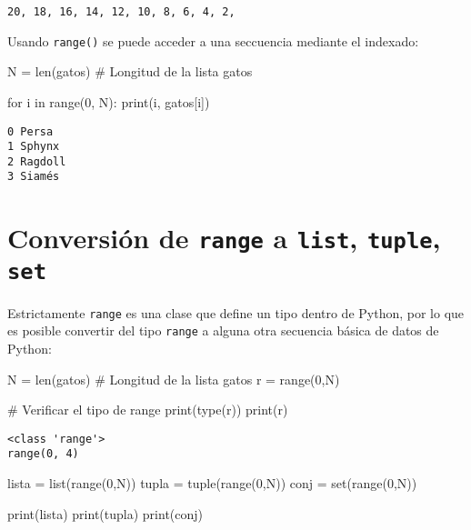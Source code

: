 \documentclass[
  letterpaper,
  DIV=11,
  numbers=noendperiod]{scrreprt}
\newenvironment{Shaded}{\begin{snugshade}}{\end{snugshade}}
\newcommand{\BuiltInTok}[1]{\textcolor[rgb]{0.00,0.23,0.31}{#1}}
\newcommand{\CommentTok}[1]{\textcolor[rgb]{0.37,0.37,0.37}{#1}}
\newcommand{\ControlFlowTok}[1]{\textcolor[rgb]{0.00,0.23,0.31}{#1}}
\newcommand{\DecValTok}[1]{\textcolor[rgb]{0.68,0.00,0.00}{#1}}
\newcommand{\KeywordTok}[1]{\textcolor[rgb]{0.00,0.23,0.31}{#1}}
\newcommand{\NormalTok}[1]{\textcolor[rgb]{0.00,0.23,0.31}{#1}}
\newcommand{\OperatorTok}[1]{\textcolor[rgb]{0.37,0.37,0.37}{#1}}
\begin{document}
\begin{verbatim}
20, 18, 16, 14, 12, 10, 8, 6, 4, 2, 
\end{verbatim}

Usando \texttt{range()} se puede acceder a una seccuencia mediante el
indexado:

\begin{Shaded}
\begin{Highlighting}[]
\NormalTok{N }\OperatorTok{=} \BuiltInTok{len}\NormalTok{(gatos) }\CommentTok{\# Longitud de la lista gatos}

\ControlFlowTok{for}\NormalTok{ i }\KeywordTok{in} \BuiltInTok{range}\NormalTok{(}\DecValTok{0}\NormalTok{, N):}
    \BuiltInTok{print}\NormalTok{(i, gatos[i])}
\end{Highlighting}
\end{Shaded}

\begin{verbatim}
0 Persa
1 Sphynx
2 Ragdoll
3 Siamés
\end{verbatim}

\section{\texorpdfstring{Conversión de \texttt{range} a \texttt{list},
\texttt{tuple},
\texttt{set}}{Conversión de range a list, tuple, set}}\label{conversiuxf3n-de-range-a-list-tuple-set}

Estrictamente \texttt{range} es una clase que define un tipo dentro de
Python, por lo que es posible convertir del tipo \texttt{range} a alguna
otra secuencia básica de datos de Python:

\begin{Shaded}
\begin{Highlighting}[]
\NormalTok{N }\OperatorTok{=} \BuiltInTok{len}\NormalTok{(gatos) }\CommentTok{\# Longitud de la lista gatos}
\NormalTok{r }\OperatorTok{=} \BuiltInTok{range}\NormalTok{(}\DecValTok{0}\NormalTok{,N)}

\CommentTok{\# Verificar el tipo de range}
\BuiltInTok{print}\NormalTok{(}\BuiltInTok{type}\NormalTok{(r))}
\BuiltInTok{print}\NormalTok{(r)}
\end{Highlighting}
\end{Shaded}

\begin{verbatim}
<class 'range'>
range(0, 4)
\end{verbatim}

\begin{Shaded}
\begin{Highlighting}[]
\NormalTok{lista }\OperatorTok{=} \BuiltInTok{list}\NormalTok{(}\BuiltInTok{range}\NormalTok{(}\DecValTok{0}\NormalTok{,N))}
\NormalTok{tupla }\OperatorTok{=} \BuiltInTok{tuple}\NormalTok{(}\BuiltInTok{range}\NormalTok{(}\DecValTok{0}\NormalTok{,N))}
\NormalTok{conj }\OperatorTok{=} \BuiltInTok{set}\NormalTok{(}\BuiltInTok{range}\NormalTok{(}\DecValTok{0}\NormalTok{,N))}

\BuiltInTok{print}\NormalTok{(lista)}
\BuiltInTok{print}\NormalTok{(tupla)}
\BuiltInTok{print}\NormalTok{(conj)}
\end{Highlighting}
\end{Shaded}
\end{document}
